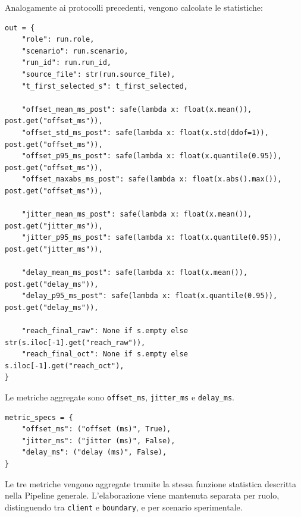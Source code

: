 Analogamente ai protocolli precedenti, vengono calcolate le statistiche:

\begin{listing}[H]
\begin{verbatim}
out = {
    "role": run.role,
    "scenario": run.scenario,
    "run_id": run.run_id,
    "source_file": str(run.source_file),
    "t_first_selected_s": t_first_selected,

    "offset_mean_ms_post": safe(lambda x: float(x.mean()), post.get("offset_ms")),
    "offset_std_ms_post": safe(lambda x: float(x.std(ddof=1)), post.get("offset_ms")),
    "offset_p95_ms_post": safe(lambda x: float(x.quantile(0.95)), post.get("offset_ms")),
    "offset_maxabs_ms_post": safe(lambda x: float(x.abs().max()), post.get("offset_ms")),

    "jitter_mean_ms_post": safe(lambda x: float(x.mean()), post.get("jitter_ms")),
    "jitter_p95_ms_post": safe(lambda x: float(x.quantile(0.95)), post.get("jitter_ms")),

    "delay_mean_ms_post": safe(lambda x: float(x.mean()), post.get("delay_ms")),
    "delay_p95_ms_post": safe(lambda x: float(x.quantile(0.95)), post.get("delay_ms")),

    "reach_final_raw": None if s.empty else str(s.iloc[-1].get("reach_raw")),
    "reach_final_oct": None if s.empty else s.iloc[-1].get("reach_oct"),
}
\end{verbatim}
\caption{Statistiche per-run calcolate dal parser NTPsec.}
\label{lst:ntpsec-run-summary}
\end{listing}

Le metriche aggregate sono \texttt{offset\_ms}, \texttt{jitter\_ms} e \texttt{delay\_ms}.

\begin{listing}[H]
\begin{verbatim}
metric_specs = {
    "offset_ms": ("offset (ms)", True),
    "jitter_ms": ("jitter (ms)", False),
    "delay_ms": ("delay (ms)", False),
}
\end{verbatim}
\caption{Metriche NTPsec aggregate nello script di analisi.}
\label{lst:ntpsec-metric-specs}
\end{listing}

Le tre metriche vengono aggregate tramite la stessa funzione statistica descritta
nella Pipeline generale. L'elaborazione viene mantenuta separata per ruolo,
distinguendo tra \texttt{client} e \texttt{boundary}, e per scenario
sperimentale.

